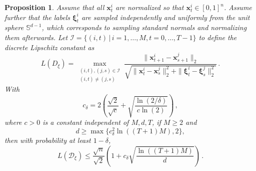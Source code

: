 \documentclass{article}
\theoremstyle{plain}
\newtheorem{proposition}[theorem]{Proposition}
\theoremstyle{definition}
\theoremstyle{remark}
\newcommand{\bfxi}{{\bm \xi}}
\newcommand{\x}{\bm{x}}
\newcommand{\bfx}{\bm{x}}
\begin{document}
\begin{proposition}
  Assume that all $\x_t^i$ are normalized so that $\x_t^i \in [0, 1]^n$. Assume further that the labels $\bfxi_t^i$ are sampled independently and uniformly from the unit sphere $\mathbb{S}^{d - 1}$, which corresponds to sampling standard normals and normalizing them afterwards. Let $\mathcal{I} = \{(i, t) \,|\, i = 1, \dots, M, t = 0, \dots, T - 1\}$ to define the discrete Lipschitz constant as 
  \[
  L(D_{\xi}) = \max_{\substack{(i, t), (j, s) \in \mathcal{I}\\(i, t) \neq (j, s)}} \frac{\|\bfx_{t + 1}^i - \bfx_{s + 1}^j\|_2}{\sqrt{\|\bfx_t^i - \bfx_s^j\|_2^2 + \|\bfxi_t^i - \bfxi_s^j\|_2^2}}\,.
  \]
  With
  \begin{equation}
    \label{eq:appdx:proofcdelta}
    c_{\delta} = 2\left(\frac{\sqrt{2}}{\sqrt{c}} + \sqrt{\frac{\ln(2/\delta)}{c\ln(2)}}\right)\,,
  \end{equation}
  where $c > 0$ is a constant independent of $M, d, T$, if $M \geq 2$ and
  \begin{equation}\label{appendix:eq:DAsm}
  d \geq \max\{c_{\delta}^2 \ln((T + 1)M), 2\},
  \end{equation}
  then with probability at least $1 - \delta$, 
 \begin{equation}
    \label{eq:appdx:BoundLipschitz}
    L(\mathcal{D}_{\xi}) \leq \frac{\sqrt{n}}{\sqrt{2}}\left(1 + c_{\delta}\sqrt{\frac{\ln((T + 1)M)}{d}}\right)\,.
  \end{equation}
\end{proposition}
\end{document}
